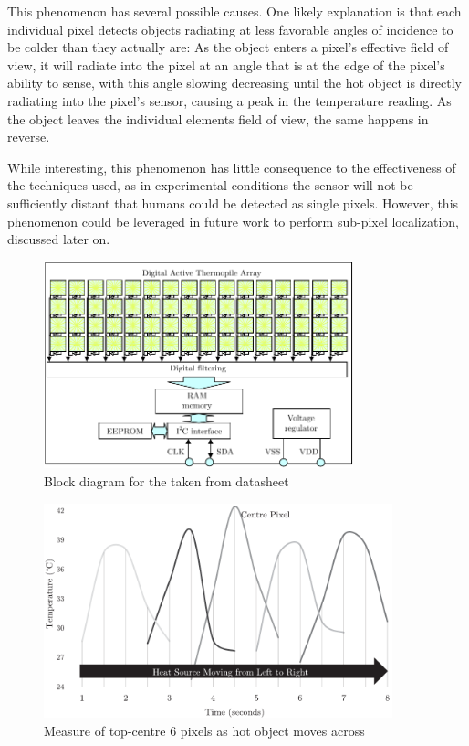 \documentclass[../thesis/thesis.tex]{subfiles}
\begin{document}
This phenomenon has several possible causes. One likely explanation is that each individual pixel detects objects radiating at less favorable angles of incidence to be colder than they actually are: As the object enters a pixel's effective field of view, it will radiate into the pixel at an angle that is at the edge of the pixel's ability to sense, with this angle slowing decreasing until the hot object is directly radiating into the pixel's sensor, causing a peak in the temperature reading. As the object leaves the individual elements field of view, the same happens in reverse.

While interesting, this phenomenon has little consequence to the effectiveness of the techniques used, as in experimental conditions the sensor will not be sufficiently distant that humans could be detected as single pixels. However, this phenomenon could be leveraged in future work to perform sub-pixel localization, discussed later on.


\begin{figure}
\centering
\includegraphics[width=0.8\textwidth]{../diagrams/mlx-block-diagram.pdf}
\caption{Block diagram for the \mlx taken from datasheet \cite{MLXDatasheet}}
\label{fig:exps:blockdia}
\end{figure}

\begin{figure}
\centering
\includegraphics[width=0.9\textwidth]{../diagrams/03_hot_water_top_row_modified.pdf}
\caption{Measure of top-centre 6 \mlx pixels as hot object moves across}
\label{fig:hotmotion}
\end{figure}
\end{document}
